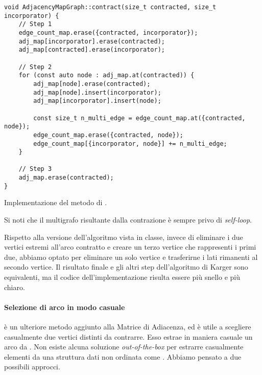 \begin{listing}[!ht]
\begin{verbatim}
void AdjacencyMapGraph::contract(size_t contracted, size_t incorporator) {
    // Step 1
    edge_count_map.erase({contracted, incorporator});
    adj_map[incorporator].erase(contracted);
    adj_map[contracted].erase(incorporator);

    // Step 2
    for (const auto node : adj_map.at(contracted)) {
        adj_map[node].erase(contracted);
        adj_map[node].insert(incorporator);
        adj_map[incorporator].insert(node);

        const size_t n_multi_edge = edge_count_map.at({contracted, node});
        edge_count_map.erase({contracted, node});
        edge_count_map[{incorporator, node}] += n_multi_edge;
    }

    // Step 3
    adj_map.erase(contracted);
}
\end{verbatim}
\caption{Implementazione del metodo  di .}
\label{listing:met-contract}
\end{listing}

Si noti che il multigrafo risultante dalla contrazione è sempre privo di \textit{self-loop}.

\begin{obser}
Rispetto alla versione dell'algoritmo vista in classe, invece di eliminare i due vertici estremi all'arco contratto e creare un terzo vertice che rappresenti i primi due, abbiamo optato per eliminare un solo vertice e trasferirne i lati rimanenti al secondo vertice. Il risultato finale e gli altri step dell'algoritmo di Karger sono equivalenti, ma il codice dell'implementazione risulta essere più snello e più chiaro.
\end{obser}

\paragraph{Selezione di arco in modo casuale}

 è un ulteriore metodo aggiunto alla Matrice di Adiacenza, ed è utile a scegliere casualmente due vertici distinti da contrarre. Esso estrae in maniera casuale un arco da .
Non esiste alcuna soluzione \textit{out-of-the-box} per estrarre casualmente elementi da una struttura dati non ordinata come . Abbiamo pensato a due possibili approcci. \\

